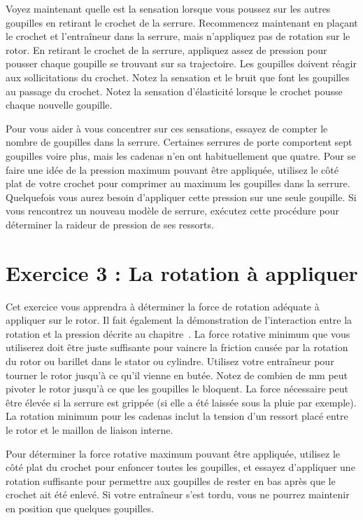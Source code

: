\documentclass[a4paper,french,11pt,twoside]{report}
\begin{document}
Voyez maintenant quelle est la sensation lorsque vous poussez sur les autres goupilles en retirant le crochet de la serrure. Recommencez maintenant en plaçant le crochet et l'entraîneur dans la serrure, mais n'appliquez pas de rotation sur le rotor. En retirant le crochet de la serrure, appliquez assez de pression pour pousser chaque goupille se trouvant sur sa trajectoire. Les goupilles doivent réagir aux sollicitations du crochet. Notez la sensation et le bruit que font les goupilles au passage du crochet. Notez la sensation d'élasticité lorsque le crochet pousse chaque nouvelle goupille.

Pour vous aider à vous concentrer sur ces sensations, essayez de compter le nombre de goupilles dans la serrure. Certaines serrures de porte comportent sept goupilles voire plus, mais les cadenas n'en ont habituellement que quatre. Pour se faire une idée de la pression maximum pouvant être appliquée, utilisez le côté plat de votre crochet pour comprimer au maximum les goupilles dans la serrure. Quelquefois vous aurez besoin d'appliquer cette pression sur une seule goupille. Si vous rencontrez un nouveau modèle de serrure, exécutez cette procédure pour déterminer la raideur de pression de ses ressorts.

\section{Exercice 3 : La rotation à appliquer}

Cet exercice vous apprendra à déterminer la force de rotation adéquate à appliquer sur le rotor. Il fait également la démonstration de l'interaction entre la rotation et la pression décrite au chapitre~. La force rotative minimum que vous utiliserez doit être juste suffisante pour vaincre la friction causée par la rotation du rotor ou barillet dans le stator ou cylindre. Utilisez votre entraîneur pour tourner le rotor jusqu'à ce qu'il vienne en butée. Notez de combien de mm peut pivoter le rotor jusqu'à ce que les goupilles le bloquent. La force nécessaire peut être élevée si la serrure est grippée (si elle a été laissée sous la pluie par exemple). La rotation minimum pour les cadenas inclut la tension d'un ressort placé entre le rotor et le maillon de liaison interne.

Pour déterminer la force rotative maximum pouvant être appliquée, utilisez le côté plat du crochet pour enfoncer toutes les goupilles, et essayez d'appliquer une rotation suffisante pour permettre aux goupilles de rester en bas après que le crochet ait été enlevé. Si votre entraîneur s'est tordu, vous ne pourrez maintenir en position que quelques goupilles.
\end{document}
